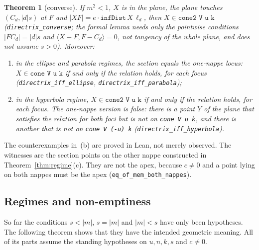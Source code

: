 \documentclass[11pt]{article}
\newtheorem{theorem}{Theorem}
\theoremstyle{remark}
\newcommand{\lean}[1]{\texttt{#1}}
\newcommand{\ip}[2]{\langle #1,#2\rangle}
\begin{document}
\begin{theorem}[converse]\label{thm:dirconv}
If $m^2<1$, $X$ is in the plane, the plane touches $(C_d,|d|s)$ at $F$ and
$|XF|=e\cdot\lean{infDist}\,X\,\ell_d$, then $X\in\lean{cone2 V u k}$
(\lean{directrix\_converse}; the formal lemma needs only the pointwise conditions $|FC_d|=|d|s$ and
$\ip{X-F}{F-C_d}=0$, not tangency of the whole plane, and does not assume $s>0$). Moreover:
\begin{enumerate}
\item[(a)] in the ellipse and parabola regimes, the section equals the one-nappe locus: $X\in\lean{cone V u k}$ if and
only if the relation holds, for each focus (\lean{directrix\_iff\_ellipse},
\lean{directrix\_iff\_parabola});
\item[(b)] in the hyperbola regime, $X\in\lean{cone2 V u k}$ if and only if the relation holds, for each
focus. The one-nappe version is false: there is a point $Y$ of the plane that satisfies the relation for
\emph{both} foci but is not on \lean{cone V u k}, and there is another that is not on \lean{cone V (-u) k}
(\lean{directrix\_iff\_hyperbola}).
\end{enumerate}
\end{theorem}

The counterexamples in~(b) are proved in Lean, not merely observed. The witnesses are the section
points on the other nappe constructed in Theorem~\ref{thm:regime}(c). They are not the apex,
because $c\ne0$ and a point lying on both nappes must be the apex (\lean{eq\_of\_mem\_both\_nappes}).

\subsection{Regimes and non-emptiness}\label{sec:regime}

So far the conditions $s<|m|$, $s=|m|$ and $|m|<s$ have only been hypotheses. The following
theorem shows that they have the intended geometric meaning. All of its parts assume the standing
hypotheses on $u,n,k,s$ and $c\ne0$.
\end{document}
